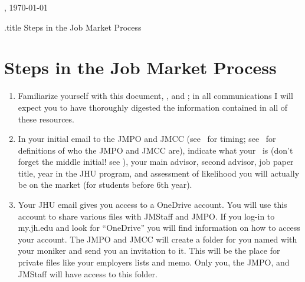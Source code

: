 \documentclass{\classes/econtex}
\begin{document}
\hfill{\tiny \jobname, \today} \vspace{0.1in}

\begin{verbatimwrite}{\jobname.title}
  Steps in the Job Market Process
\end{verbatimwrite}

\section*{\Large Steps in the Job Market Process}\medskip\medskip

\begin{enumerate}
\item Familiarize yourself with this document, \timet, and \faq; in all communications I will expect you
  to have thoroughly digested the information contained in all of these resources.

\item In your initial email to the JMPO and JMCC (see \timet~for timing; see \ntn~for definitions of who the JMPO and JMCC are), indicate what your \Moniker~is (don't forget the middle initial!  see \Notation), your main advisor, second advisor, job paper title,
  year in the JHU program, and assessment of likelihood you will
  actually be on the market (for students before 6th year).
  
  \hypertarget{OneDrive}{}
\item Your JHU email gives you access to a OneDrive account. You will use this account to share various files with JMStaff and JMPO. If you log-in to my.jh.edu and look for ``OneDrive'' you will find information on how to access your account. The JMPO and JMCC will create a folder for you named with your moniker and send you an invitation to it. This will be the place for private files like your employers lists and memo. Only you, the JMPO, and JMStaff will have access to this folder.


\end{enumerate}
\end{document}
